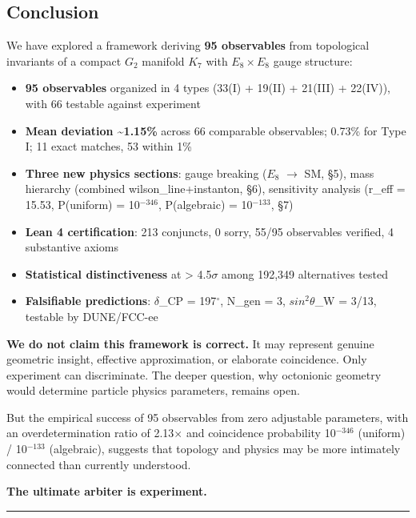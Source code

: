 \documentclass[11pt,a4paper]{article}
\begin{document}
\subsection{Conclusion}

We have explored a framework deriving \textbf{95 observables} from
topological invariants of a compact \(G_{2}\) manifold \(K_{7}\) with
\(E_{8} \times E_{8}\) gauge structure:

\begin{itemize}

\item
  \textbf{95 observables} organized in 4 types (33(I) + 19(II) + 21(III)
  + 22(IV)), with 66 testable against experiment
\item
  \textbf{Mean deviation \textasciitilde1.15\%} across 66 comparable
  observables; 0.73\% for Type I; 11 exact matches, 53 within 1\%
\item
  \textbf{Three new physics sections}: gauge breaking (\(E_{8}\) \(\to\)
  SM, §5), mass hierarchy (combined wilson\_line+instanton, §6),
  sensitivity analysis (r\_eff = 15.53, P(uniform) = 10\(^{-346}\),
  P(algebraic) = 10\(^{-133}\), §7)
\item
  \textbf{Lean 4 certification}: 213 conjuncts, 0 sorry, 55/95
  observables verified, 4 substantive axioms
\item
  \textbf{Statistical distinctiveness} at \textgreater{} 4.5\(\sigma\)
  among 192,349 alternatives tested
\item
  \textbf{Falsifiable predictions}: \(\delta\)\_CP = 197\({}^{\circ}\),
  N\_gen = 3, \(sin^{2} \theta\)\_W = 3/13, testable by DUNE/FCC-ee
\end{itemize}

\textbf{We do not claim this framework is correct.} It may represent
genuine geometric insight, effective approximation, or elaborate
coincidence. Only experiment can discriminate. The deeper question,
why octonionic geometry would determine particle physics parameters,
remains open.

But the empirical success of 95 observables from zero adjustable
parameters, with an overdetermination ratio of 2.13\(\times\) and
coincidence probability 10\(^{-346}\) (uniform) / 10\(^{-133}\)
(algebraic), suggests that topology and physics may be more intimately
connected than currently understood.

\textbf{The ultimate arbiter is experiment.}

\noindent

\rule{\textwidth}{0.2pt}
\end{document}
